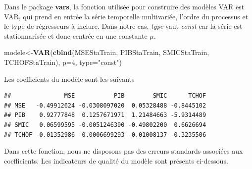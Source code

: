 \documentclass[11pt,]{article}
\newenvironment{Shaded}{\begin{snugshade}}{\end{snugshade}}
\newcommand{\KeywordTok}[1]{\textcolor[rgb]{0.13,0.29,0.53}{\textbf{{#1}}}}
\newcommand{\DataTypeTok}[1]{\textcolor[rgb]{0.13,0.29,0.53}{{#1}}}
\newcommand{\DecValTok}[1]{\textcolor[rgb]{0.00,0.00,0.81}{{#1}}}
\newcommand{\StringTok}[1]{\textcolor[rgb]{0.31,0.60,0.02}{{#1}}}
\newcommand{\NormalTok}[1]{{#1}}
\begin{document}
Dans le package \textbf{vars}, la fonction utilisée pour construire des
modèles VAR est VAR, qui prend en entrée la série temporelle
multivariée, l'ordre du processus et le type de régresseurs à inclure.
Dans notre cas, \emph{type} vaut \emph{const} car la série est
stationnarisée et donc centrée en une constante \(\mu\).

\begin{Shaded}
\begin{Highlighting}[]
\NormalTok{modele<-}\KeywordTok{VAR}\NormalTok{(}\KeywordTok{cbind}\NormalTok{(MSEStaTrain, PIBStaTrain, SMICStaTrain, TCHOFStaTrain), }\DataTypeTok{p=}\DecValTok{4}\NormalTok{, }\DataTypeTok{type=}\StringTok{"const"}\NormalTok{)}
\end{Highlighting}
\end{Shaded}

Les coefficients du modèle sont les suivants

\begin{Shaded}
\end{Shaded}

\begin{verbatim}
##               MSE           PIB        SMIC      TCHOF
## MSE   -0.49912624 -0.0308097020  0.05328488 -0.8445102
## PIB    0.92777848  0.1257671971  1.21484663 -5.9314489
## SMIC   0.06599595 -0.0051246390 -0.49802200  0.6626694
## TCHOF -0.01352986  0.0006699293 -0.01008137 -0.3235506
\end{verbatim}

Dans cette fonction, nous ne disposons pas des erreurs standards
associées aux coefficients. Les indicateurs de qualité du modèle sont
présents ci-dessous.
\end{document}
